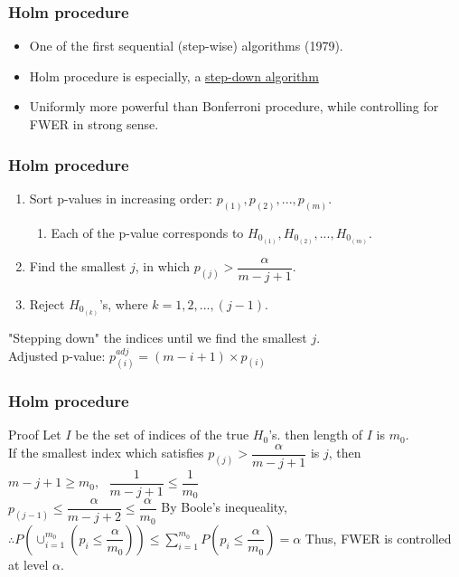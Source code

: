 \documentclass{beamer}
\begin{document}
\frame
{
    \frametitle{Holm procedure}
    \begin{itemize}
      \item One of the first sequential (step-wise) algorithms (1979).\vspace{0.1in}
      \item Holm procedure is especially, a \underline{step-down algorithm}\vspace{0.22in}\\
      \item Uniformly more powerful than Bonferroni procedure, while controlling for FWER in strong sense.\\
    \end{itemize}
}

\frame
{
    \frametitle{Holm procedure}
    \begin{enumerate}
  \item Sort p-values in increasing order: $p_{(1)}, p_{(2)}, ..., p_{(m)}$.
    \begin{enumerate}[-]
    \item Each of the p-value corresponds to $H_{0_{(1)}}, H_{0_{(2)}}, ..., H_{0_{(m)}}$. 
    \end{enumerate}
  \item Find the smallest $j$, in which $p_{(j)} > \dfrac{\alpha}{m-j+1}$.
  \item Reject $H_{0_{(k)}}$'s, where $k=1, 2, ..., (j-1)$.\vspace{0.22in}\\
  \end{enumerate}  
  "Stepping down" the indices until we find the smallest $j$.\vspace{0.1in}\\
  Adjusted p-value: $p_{(i)}^{adj}=(m-i+1)\times p_{(i)}$\\
}

\frame
{
    \frametitle{Holm procedure}
    \begin{block}{Proof}
      Let $I$ be the set of indices of the true $H_0$'s. then length of $I$ is $m_0$.\vspace{0.07in}\\
      If the smallest index which satisfies $p_{(j)} > \dfrac{\alpha}{m-j+1}$ is $j$, then
      \center $m-j+1 \geq m_0,\text{ } \dfrac{1}{m-j+1} \leq \dfrac{1}{m_0}$\\
      $p_{(j-1)} \leq \dfrac{\alpha}{m-j+2} \leq \dfrac{\alpha}{m_0}$
      \flushleft
      By Boole's inequeality,\\
      \center $\therefore P(\cup_{i=1}^{m_0}(p_i\leq\dfrac{\alpha}{m_0}))\leq\sum_{i=1}^{m_0}P(p_i\leq\dfrac{\alpha}{m_0})=\alpha$ \vspace{0.07in} \flushleft
      Thus, FWER is controlled at level $\alpha$.
    \end{block}
}
\end{document}
